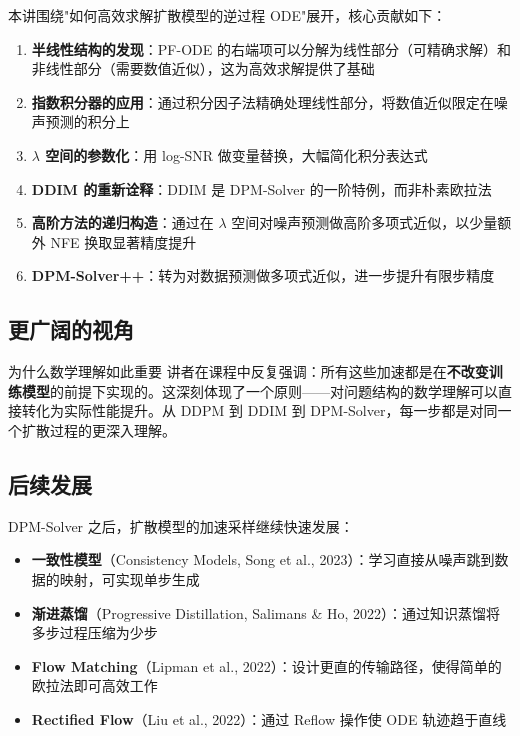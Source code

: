 \documentclass[a4paper]{article}
\begin{document}
本讲围绕"如何高效求解扩散模型的逆过程 ODE"展开，核心贡献如下：

\begin{enumerate}
    \item \textbf{半线性结构的发现}：PF-ODE 的右端项可以分解为线性部分（可精确求解）和非线性部分（需要数值近似），这为高效求解提供了基础
    \item \textbf{指数积分器的应用}：通过积分因子法精确处理线性部分，将数值近似限定在噪声预测的积分上
    \item \textbf{$\lambda$ 空间的参数化}：用 log-SNR 做变量替换，大幅简化积分表达式
    \item \textbf{DDIM 的重新诠释}：DDIM 是 DPM-Solver 的一阶特例，而非朴素欧拉法
    \item \textbf{高阶方法的递归构造}：通过在 $\lambda$ 空间对噪声预测做高阶多项式近似，以少量额外 NFE 换取显著精度提升
    \item \textbf{DPM-Solver++}：转为对数据预测做多项式近似，进一步提升有限步精度
\end{enumerate}

\subsection{更广阔的视角}

\begin{knowledgebox}{为什么数学理解如此重要}
讲者在课程中反复强调：所有这些加速都是在\textbf{不改变训练模型}的前提下实现的。这深刻体现了一个原则——对问题结构的数学理解可以直接转化为实际性能提升。从 DDPM 到 DDIM 到 DPM-Solver，每一步都是对同一个扩散过程的更深入理解。
\end{knowledgebox}

\subsection{后续发展}

DPM-Solver 之后，扩散模型的加速采样继续快速发展：

\begin{itemize}
    \item \textbf{一致性模型}（Consistency Models, Song et al., 2023）：学习直接从噪声跳到数据的映射，可实现单步生成
    \item \textbf{渐进蒸馏}（Progressive Distillation, Salimans \& Ho, 2022）：通过知识蒸馏将多步过程压缩为少步
    \item \textbf{Flow Matching}（Lipman et al., 2022）：设计更直的传输路径，使得简单的欧拉法即可高效工作
    \item \textbf{Rectified Flow}（Liu et al., 2022）：通过 Reflow 操作使 ODE 轨迹趋于直线
\end{itemize}
\end{document}
